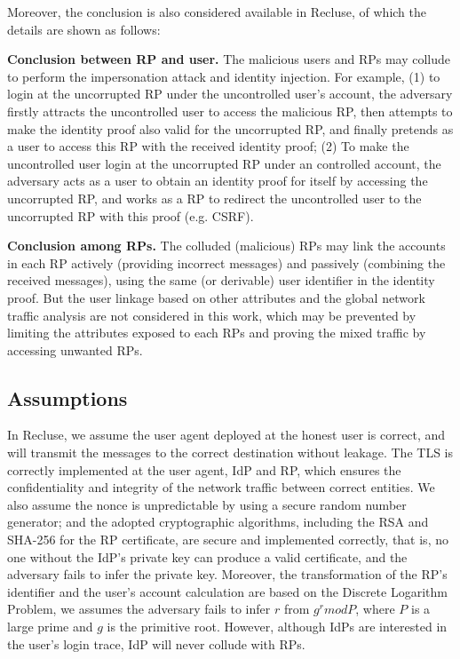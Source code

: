 Moreover, the conclusion is also considered available in Recluse, of which the details are shown as follows:

\textbf{Conclusion between RP and user.} The malicious users and RPs may collude to perform the impersonation attack and identity injection. For example, (1) to login at the uncorrupted RP under the uncontrolled user's account, the adversary firstly attracts the uncontrolled user to access the malicious RP, then attempts to make the identity proof also valid for the uncorrupted RP, and finally pretends as a user to access this RP with the received identity proof; (2) To make the uncontrolled user login at the uncorrupted RP under an controlled account, the adversary acts as a user to obtain an identity proof for itself by accessing the uncorrupted RP, and works as a RP to redirect the uncontrolled user to the uncorrupted RP with this proof (e.g. CSRF).

\textbf{Conclusion among RPs.} The colluded (malicious) RPs may link the accounts in each RP actively (providing incorrect messages) and passively (combining the received messages),  using the same (or derivable) user identifier in the identity proof. But the user linkage based on other attributes and the global network traffic analysis are not considered in this work, which may be prevented by limiting the attributes exposed to each RPs and proving the mixed traffic by accessing unwanted RPs.


\subsection{Assumptions}
In Recluse, we assume the user agent deployed at the honest user is correct, and will transmit the messages to the correct destination without leakage. The TLS is correctly implemented at the user agent, IdP and RP, which ensures the confidentiality and integrity of the network traffic between correct entities. We also assume the nonce is unpredictable by using  a secure random number generator; and the adopted cryptographic algorithms, including the RSA and SHA-256 for the RP certificate, are secure and implemented correctly, that is, no one without the IdP's private key can produce a valid certificate, and the adversary fails to infer the private key. Moreover, the transformation of the RP's identifier and the user's account calculation are based on the Discrete Logarithm Problem, we assumes the adversary fails to infer $r$ from $g^r mod P$, where $P$ is a large prime and $g$ is the primitive root. However, although IdPs are interested in the user's login trace, IdP will never collude with RPs.







